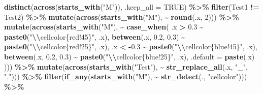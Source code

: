 \documentclass[
]{article}
\newenvironment{Shaded}{\begin{snugshade}}{\end{snugshade}}
\newcommand{\AttributeTok}[1]{\textcolor[rgb]{0.13,0.29,0.53}{#1}}
\newcommand{\ConstantTok}[1]{\textcolor[rgb]{0.56,0.35,0.01}{#1}}
\newcommand{\DecValTok}[1]{\textcolor[rgb]{0.00,0.00,0.81}{#1}}
\newcommand{\FloatTok}[1]{\textcolor[rgb]{0.00,0.00,0.81}{#1}}
\newcommand{\FunctionTok}[1]{\textcolor[rgb]{0.13,0.29,0.53}{\textbf{#1}}}
\newcommand{\NormalTok}[1]{#1}
\newcommand{\SpecialCharTok}[1]{\textcolor[rgb]{0.81,0.36,0.00}{\textbf{#1}}}
\newcommand{\StringTok}[1]{\textcolor[rgb]{0.31,0.60,0.02}{#1}}
\begin{document}
\begin{Shaded}
\begin{Highlighting}[]
    \FunctionTok{distinct}\NormalTok{(}\FunctionTok{across}\NormalTok{(}\FunctionTok{starts\_with}\NormalTok{(}\StringTok{"M"}\NormalTok{)), }\AttributeTok{.keep\_all =} \ConstantTok{TRUE}\NormalTok{) }\SpecialCharTok{\%\textgreater{}\%}
    \FunctionTok{filter}\NormalTok{(Test1 }\SpecialCharTok{!=}\NormalTok{ Test2) }\SpecialCharTok{\%\textgreater{}\%}
    \FunctionTok{mutate}\NormalTok{(}\FunctionTok{across}\NormalTok{(}\FunctionTok{starts\_with}\NormalTok{(}\StringTok{"M"}\NormalTok{), }\SpecialCharTok{\textasciitilde{}} \FunctionTok{round}\NormalTok{(.x, }\DecValTok{2}\NormalTok{))) }\SpecialCharTok{\%\textgreater{}\%}
    \FunctionTok{mutate}\NormalTok{(}\FunctionTok{across}\NormalTok{(}\FunctionTok{starts\_with}\NormalTok{(}\StringTok{"M"}\NormalTok{), }\SpecialCharTok{\textasciitilde{}} \FunctionTok{case\_when}\NormalTok{(}
\NormalTok{      .x }\SpecialCharTok{\textgreater{}} \FloatTok{0.3} \SpecialCharTok{\textasciitilde{}} \FunctionTok{paste0}\NormalTok{(}\StringTok{"}\SpecialCharTok{\textbackslash{}\textbackslash{}}\StringTok{cellcolor\{red!45\}"}\NormalTok{, .x),}
      \FunctionTok{between}\NormalTok{(.x, }\FloatTok{0.2}\NormalTok{, }\FloatTok{0.3}\NormalTok{) }\SpecialCharTok{\textasciitilde{}} \FunctionTok{paste0}\NormalTok{(}\StringTok{"}\SpecialCharTok{\textbackslash{}\textbackslash{}}\StringTok{cellcolor\{red!25\}"}\NormalTok{, .x),}
\NormalTok{      .x }\SpecialCharTok{\textless{}} \SpecialCharTok{{-}}\FloatTok{0.3} \SpecialCharTok{\textasciitilde{}} \FunctionTok{paste0}\NormalTok{(}\StringTok{"}\SpecialCharTok{\textbackslash{}\textbackslash{}}\StringTok{cellcolor\{blue!45\}"}\NormalTok{, .x),}
      \FunctionTok{between}\NormalTok{(.x, }\FloatTok{0.2}\NormalTok{, }\FloatTok{0.3}\NormalTok{) }\SpecialCharTok{\textasciitilde{}} \FunctionTok{paste0}\NormalTok{(}\StringTok{"}\SpecialCharTok{\textbackslash{}\textbackslash{}}\StringTok{cellcolor\{blue!25\}"}\NormalTok{, .x),}
      \AttributeTok{.default =} \FunctionTok{paste}\NormalTok{(.x)}
\NormalTok{    ))) }\SpecialCharTok{\%\textgreater{}\%}
    \FunctionTok{mutate}\NormalTok{(}\FunctionTok{across}\NormalTok{(}\FunctionTok{starts\_with}\NormalTok{(}\StringTok{"Test"}\NormalTok{), }\SpecialCharTok{\textasciitilde{}} \FunctionTok{str\_replace\_all}\NormalTok{(.x, }\StringTok{"\_"}\NormalTok{, }\StringTok{"."}\NormalTok{))) }\SpecialCharTok{\%\textgreater{}\%}
    \FunctionTok{filter}\NormalTok{(}\FunctionTok{if\_any}\NormalTok{(}\FunctionTok{starts\_with}\NormalTok{(}\StringTok{"M"}\NormalTok{), }\SpecialCharTok{\textasciitilde{}} \FunctionTok{str\_detect}\NormalTok{(., }\StringTok{"cellcolor"}\NormalTok{))) }\SpecialCharTok{\%\textgreater{}\%}

\end{Highlighting}
\end{Shaded}
\end{document}
